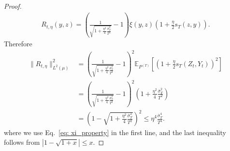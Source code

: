\documentclass[10pt,a4paper]{amsart}
\begin{document}
\begin{proof}
    \begin{align*}
        R_{t,\eta}(y,z) = \left(\frac{1}{\sqrt{1 + \frac{\eta^2}{4}\frac{\bar{\sigma}_T^2}{T^2}}} - 1\right)\xi(y,z)\left(1 + \frac{\eta}{2}s_T(z,y)\right). 
    \end{align*}
    Therefore 
    \begin{align*}
        \|R_{t,\eta}\|^2_{L^2(\mu)} &= \left(\frac{1}{\sqrt{1 + \frac{\eta^2}{4}\frac{\bar{\sigma}_T^2}{T^2}}} - 1\right)^2\mathbb{E}_{P^{(T)}}\left[\left(1 + \frac{\eta}{2}s_T(Z_t,Y_t)\right)^2\right]\\
        &= \left(\frac{1}{\sqrt{1 + \frac{\eta^2}{4}\frac{\bar{\sigma}_T^2}{T^2}}} - 1\right)^2\left(1 + \frac{\eta^2}{4}\frac{\bar{\sigma}_T^2}{T^2}\right)\\
        &= \left(1 - \sqrt{1 + \frac{\eta^2}{4}\frac{\bar{\sigma}_T^2}{T^2}}\right)^2 \leq \eta^4 \frac{\bar{\sigma}_T^4}{T^4}. 
    \end{align*}
    where we use Eq.~\eqref{eq: xi_property} in the first line, and the last inequality follows from $|1-\sqrt{1+x}|\leq x$. 
\end{proof}
\end{document}
